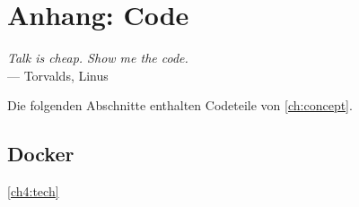 \chapter{Anhang: Code}\label{ch:anhang}
\begin{flushright}{\slshape
    Talk is cheap. Show me the code.} \\ \medskip
    --- Torvalds, Linus
\end{flushright}

\bigskip


Die folgenden Abschnitte enthalten Codeteile von \autoref{ch:concept}.

\section{Docker} \label{ap:dockerfile}
\autoref{ch4:tech}

